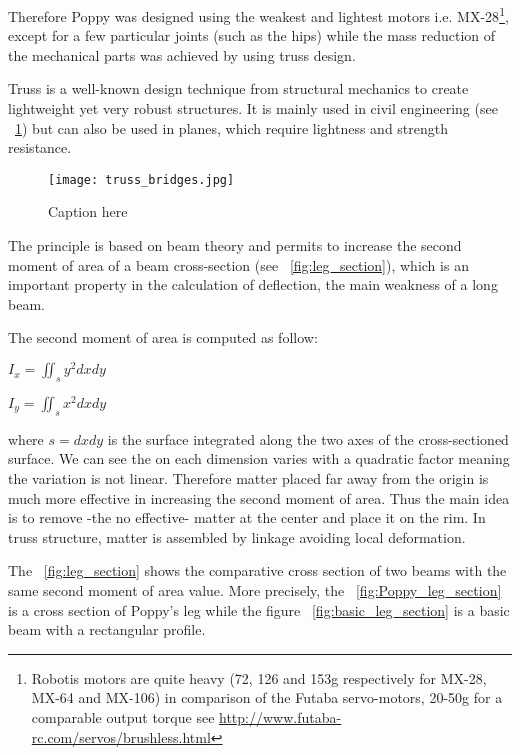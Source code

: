 Therefore Poppy was designed using the weakest and lightest motors i.e. MX-28\footnote{Robotis motors are quite heavy (72, 126 and 153g respectively for MX-28, MX-64 and MX-106) in comparison of the Futaba servo-motors, 20-50g for a comparable output torque see \url{http://www.futaba-rc.com/servos/brushless.html}}, except for a few particular joints (such as the hips) while the mass reduction of the mechanical parts was achieved by using truss design.

Truss is a well-known design technique from structural mechanics to create lightweight yet very robust structures. It is mainly used in civil engineering (see \figurename~\ref{fig:truss_bridges}) but can also be used in planes, which require lightness and strength resistance.

\begin{figure}[tb]
    \begin{center}
        \texttt{[image: truss\_bridges.jpg]}
    \end{center}
    \caption{Caption here}
    \label{fig:truss_bridges}
\end{figure}

The principle is based on beam theory and permits to increase the second moment of area of a beam cross-section (see \figurename~\ref{fig:leg_section}), which is an important property in the calculation of deflection, the main weakness of a long beam.

The second moment of area is computed as follow:

\begin{center}
    $I_x = \iint_s y^2 dxdy$

    $I_y = \iint_s x^2 dxdy$
\end{center}

where $s = dxdy$ is the surface integrated along the two axes of the cross-sectioned surface. We can see the  on each dimension varies with a quadratic factor meaning the variation is not linear. Therefore matter placed far away from the origin is much more effective in increasing the second moment of area.
Thus the main idea is to remove -the no effective- matter at the center and place it on the rim. In truss structure, matter is assembled by linkage avoiding local deformation.

The \figurename~\ref{fig:leg_section} shows the comparative cross section of two beams with the same second moment of area value. More precisely, the \figurename~\ref{fig:Poppy_leg_section} is a cross section of Poppy's leg while the figure \figurename~\ref{fig:basic_leg_section} is a basic beam with a rectangular profile.

